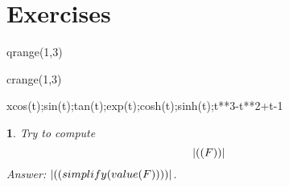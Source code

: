 \documentclass[a4paper,twoside,leqno]{article}
\newcounter{exer}
\numberwithin{exer}{subsection}
\theoremstyle{exer}
\newtheorem{exe}[exer]{}
\begin{document}
\section{Exercises}

\begin{symfor}{q}{range(1,3)}%
\begin{symfor}{c}{range(1,3)}%
\begin{symfor}{x}{cos(t);sin(t);tan(t);exp(t);cosh(t);sinh(t);t**3-t**2+t-1}%

\begin{exe}
Try to compute 
\[
\sym{F}
\]
Answer: $\sym{simplify(value(F))}$. 
\end{exe}
\end{symfor}

\end{symfor}
\end{symfor}
\end{document}
